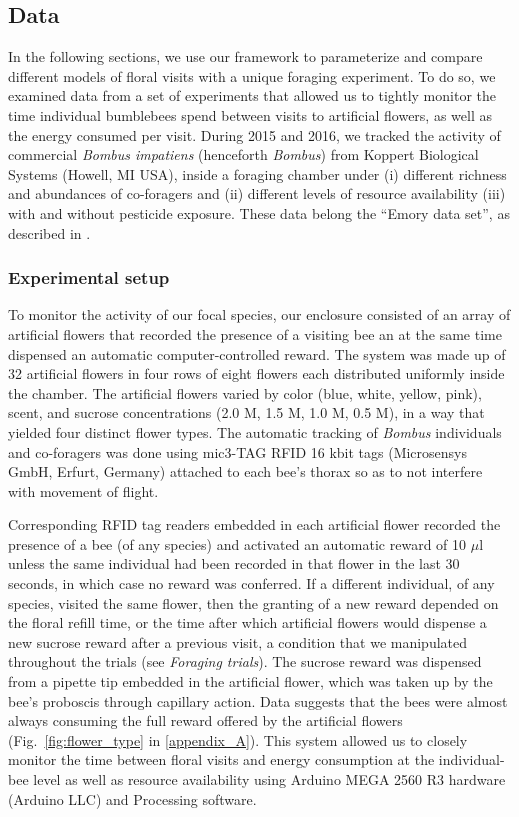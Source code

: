 \begin{refsection}
\subsection*{Data}

In the following sections, we use our framework to parameterize and compare different models of floral visits with a unique foraging experiment. To do so, we examined data from a set of experiments that allowed us to tightly monitor the time  individual bumblebees spend between visits to artificial flowers, as well as the energy consumed per visit. During 2015 and 2016, we tracked the activity of commercial \textit{Bombus impatiens} (henceforth \textit{Bombus}) from Koppert Biological Systems (Howell, MI USA), inside a foraging chamber under (i) different richness and abundances of co-foragers and (ii) different levels of resource availability (iii) with and without pesticide exposure. These data  belong the ``Emory data set'', as described in \citet{ayers_statistically_2018}.

\subsubsection*{Experimental setup}

To monitor the activity of our focal species, our enclosure consisted of an array of artificial flowers that recorded the presence of a visiting bee an at the same time dispensed an automatic computer-controlled reward. The system was made up of 32 artificial flowers in four rows of eight flowers each distributed uniformly inside the chamber. The artificial flowers varied by color (blue, white, yellow, pink), scent, and sucrose concentrations (2.0 M, 1.5 M, 1.0 M, 0.5 M), in a way that yielded four distinct flower types. The automatic tracking of \textit{Bombus} individuals and co-foragers was done using mic3-TAG RFID 16 kbit tags (Microsensys GmbH, Erfurt, Germany) attached to each bee's thorax so as to not interfere with movement of flight.

Corresponding RFID tag readers embedded in each artificial flower recorded the presence of a bee (of any species) and activated an automatic reward of  10 $\mu$l unless the same individual had been recorded in that flower in the last 30 seconds, in which case no reward was conferred. If a different individual, of any species, visited the same flower, then the granting of a new reward depended on the floral refill time, or the time after which artificial flowers would dispense a new sucrose reward after a previous visit, a condition that we manipulated throughout the trials (see \textit{Foraging trials}). The sucrose reward was dispensed from a pipette tip embedded in the artificial flower, which was taken up by the bee’s proboscis through capillary action. Data suggests that the bees were almost always consuming the full reward offered by the artificial flowers (Fig.~\ref{fig:flower_type} in \autoref{appendix_A}). This system allowed us to closely monitor the time between floral visits and energy consumption at the individual-bee level as well as resource availability using Arduino MEGA 2560 R3 hardware (Arduino LLC) and Processing software.



\end{refsection}
